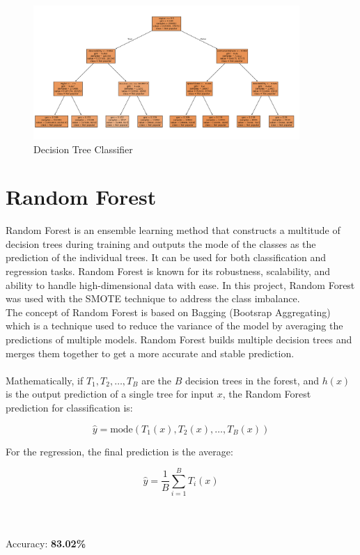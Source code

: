 \begin{figure}[H] 
    \centering 
    \includegraphics[width=0.9\textwidth]{media/decision_tree.png}
    \caption{Decision Tree Classifier}
    \label{fig:decision_tree}
\end{figure}



\section{Random Forest}
Random Forest is an ensemble learning method that constructs a multitude of decision trees during
training and outputs the mode of the classes as the prediction of the individual trees. It can be used for both classification and regression
tasks. Random Forest
is known for its robustness, scalability, and ability to handle high-dimensional data with ease.
In this project, Random Forest was used with the SMOTE technique to address the class imbalance. \\
The concept of Random Forest is based on Bagging (Bootsrap Aggregating) which is a technique used to reduce the variance of the model
by averaging the predictions of multiple models. Random Forest builds multiple decision trees and merges them together to get a more
accurate and stable prediction.
\\
\\
Mathematically, if \( T_1, T_2, \dots, T_B \) are the \( B \) decision trees in the forest, and \( h(x) \) is the output prediction of a single tree for input \( x \), the Random Forest prediction for classification is:

\[
\hat{y} = \text{mode} \left( T_1(x), T_2(x), \dots, T_B(x) \right)
\]

For the regression, the final prediction is the average:

\[
\hat{y} = \frac{1}{B} \sum_{i=1}^{B} T_i(x)
\]
\\
\\
\\
Accuracy: \textbf{83.02\%}

